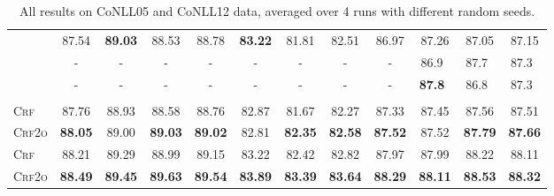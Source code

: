 \documentclass[11pt]{article}
\newcommand{\white}[1]{\textcolor{white}{#1}}
\begin{document}
\begin{table*}[tb!]
\begin{small}
\begin{tabular}{L c ccc ccc c ccc}
            \citet{zhou-etal-2022-fast}         & 87.54                       & \textbf{89.03}              & 88.53                     & 88.78          & \textbf{83.22}           & 81.81          & 82.51          & 86.97          & 87.26                  & 87.05          & 87.15          \\
            \citet{conia-navigli-2020-bridging} & -                           & -                           & -                         & -              & -                        & -              & -              & -              & 86.9\white{0}          & 87.7\white{0}  & 87.3\white{0}  \\
            \citet{blloshmi-etal-2021-generating}      & -                           & -                           & -                         & -              & -                        & -              & -              & -              & \textbf{87.8}\white{0} & 86.8\white{0}  & 87.3\white{0}  \\\\[-10pt]
            \textsc{Crf}                               & 87.76                       & 88.93                       & 88.58                     & 88.76          & 82.87                    & 81.67          & 82.27          & 87.33          & 87.45                  & 87.56          & 87.51          \\
            \textsc{Crf2o}                             & \textbf{88.05}              & 89.00                       & \textbf{89.03}            & \textbf{89.02} & 82.81                    & \textbf{82.35} & \textbf{82.58} & \textbf{87.52} & 87.52                  & \textbf{87.79} & \textbf{87.66} \\
            \hdashline[1pt/3pt]
            \textsc{Crf}                            & 88.21                       & 89.29                       & 88.99                     & 89.15          & 83.22                    & 82.42          & 82.82          & 87.97          & 87.99                  & 88.22          & 88.11          \\
            \textsc{Crf2o}                          & \textbf{88.49}              & \textbf{89.45}              & \textbf{89.63}            & \textbf{89.54} & \textbf{83.89}           & \textbf{83.39} & \textbf{83.64} & \textbf{88.29} & \textbf{88.11}         & \textbf{88.53} & \textbf{88.32} \\
            \bottomrule
        \end{tabular}
        \caption{
            All results on CoNLL05 and CoNLL12 data, averaged over 4 runs with different random seeds.
        }
        \label{table:main-results}
    \end{small}
\end{table*}
\end{document}
